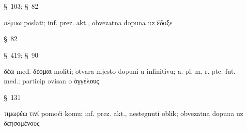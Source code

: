 \begin{description}[noitemsep]
\item[κοινῷ λόγῳ ] §~103; §~82
\item[πέμπειν ] πέμπω poslati; inf. prez. akt., obvezatna dopuna uz ἔδοξε
\item[ἀγγέλους ] §~82
\item[ἐς Σπάρτην ] §~419; §~90
\item[δεησομένους ] δέω med. δέομαι moliti; otvara mjesto dopuni u infinitivu; a. pl. m. r. ptc. fut. med.; particip ovisan o ἀγγέλους
\item[Ἴωσι ] §~131
\item[τιμωρέειν] τιμωρέω τινί pomoći komu; inf. prez. akt., nestegnuti oblik; obvezatna dopuna uz δεησομένους

\end{description}

